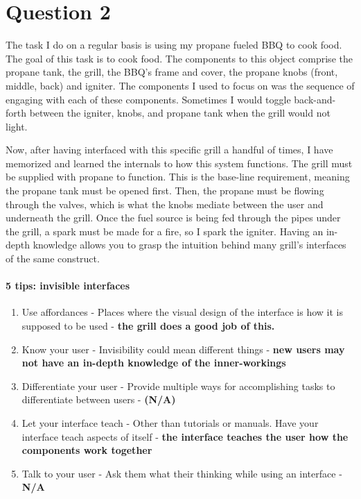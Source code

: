 \section{Question 2}

The task I do on a regular basis is using my propane fueled BBQ to cook food. The goal of this task is to cook food. The components to this object comprise the propane tank, the grill, the BBQ's frame and cover, the propane knobs (front, middle, back) and igniter. The components I used to focus on was the sequence of engaging with each of these components. Sometimes I would toggle back-and-forth between the igniter, knobs, and propane tank when the grill would not light.

Now, after having interfaced with this specific grill a handful of times, I have memorized and learned the internals to how this system functions. The grill must be supplied with propane to function. This is the base-line requirement, meaning the propane tank must be opened first. Then, the propane must be flowing through the valves, which is what the knobs mediate between the user and underneath the grill. Once the fuel source is being fed through the pipes under the grill, a spark must be made for a fire, so I spark the igniter. Having an in-depth knowledge allows you to grasp the intuition behind many grill's interfaces of the same construct.

\paragraph{5 tips: invisible interfaces}
\begin{enumerate}
\item
  Use affordances - Places where the visual design of the interface is how it is supposed to be used - \textbf{the grill does a good job of this.}
\item
  Know your user - Invisibility could mean different things - \textbf{new users may not have an in-depth knowledge of the inner-workings}
\item
  Differentiate your user - Provide multiple ways for accomplishing tasks to differentiate between users - \textbf{(N/A)}
\item
  Let your interface teach - Other than tutorials or manuals. Have your interface teach aspects of itself - \textbf{the interface teaches the user how the components work together}
\item
  Talk to your user - Ask them what their thinking while using an interface - \textbf{N/A}
\end{enumerate}


